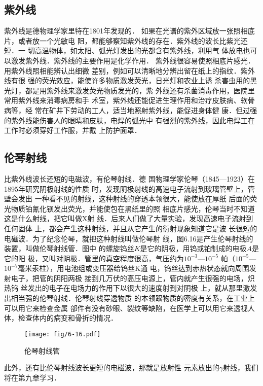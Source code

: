 \subsection{紫外线}

紫外线是德物理学家里特在1801年发现的．
如果在光谱的紫外区域放一张照相底片，或者放一个光敏电
阻，都能够察知紫外线的存在．紫外线的波长比紫光还短．一
切高温物体，如太阳、弧光灯发出的光都含有紫外线，利用气
体放电也可以激发紫外线．紫外线的主要作用是化学作用．
紫外线很容易使照相底片感光．用紫外线照相能辨认出细微
差别，例如可以清晰地分辨出留在纸上的指纹．紫外线有很
强的荧光效应，能使许多物质激发荧光，日光灯和农业上诱
杀害虫用的黑光灯，都是用紫外线来激发荧光物质发光的，紫
外线还有杀菌消毒作用，医院里常用紫外线来消毒病房和手
术室，紫外线还能促进生理作用和治疗皮肤病、软骨病等，经
常在矿井下劳动的工人，适当地照射紫外线，能促进身体健
康．但过强的紫外线能伤害人的眼睛和皮肤，电焊的弧光中
有强烈的紫外线，因此电焊工在工作时必须穿好工作服，并戴
上防护面罩．

\subsection{伦琴射线}
比紫外线波长还短的电磁波，有伦琴射线．德
国物理学家伦琴（1845—1923）在1895年研究阴极射线的性质
时，发现阴极射线的高速电子流射到玻璃管壁上，管壁会发出
一种看不见的射线，这种射线的穿透本领很大，能使放在厚纸
后面的荧光物质铂氰化钡发出荧光，并能使包在黑纸里的照
相底片感光，伦琴当时不知道这是什么射线，把它叫做X射
线．后来人们做了大量实验，发现高速电子流射到任何固体
上，都会产生这种射线，并且从它产生的衍射现象知道它是波
长很短的电磁波．为了纪念伦琴，就把这种射线叫做伦琴射
线，图6.16是产生伦琴射线的装置，叫做伦琴射线管．图中
的螺旋钨丝$K$是它的阴极，用钨或铂制成的电极$A$是它的阳
极，又叫对阴极．管里的真空程度很高，气压约为$10^{-3}$—$10^{-5}$
帕（$10^{-5}$—$10^{-7}$毫米汞柱），用电池组或变压器给钨丝K通
电，钨丝达到赤热状态就向周围发射电子，把管的阴阳两极
接到几万伏的高压电源上，管内就产生很强的电场，炽热钨
丝发出的电子在电场力的作用下以很大的速度射到对阴极
上，就从那里激发出相当强的伦琴射线．伦琴射线穿透物质
的本领跟物质的密度有关系，在工业上可以用它来检查金属
部件有没有砂眼、裂纹等缺陷，在医学上可以用它来透视人
体，检查体内的病变和骨折的情况．
\begin{figure}[htp]\centering
    \texttt{[image: fig/6-16.pdf]}
    \caption{伦琴射线管}
    \end{figure}

此外，还有比伦琴射线波长更短的电磁波，那就是放射性
元素放出的$\gamma$射线，我们将在第九章学习．

